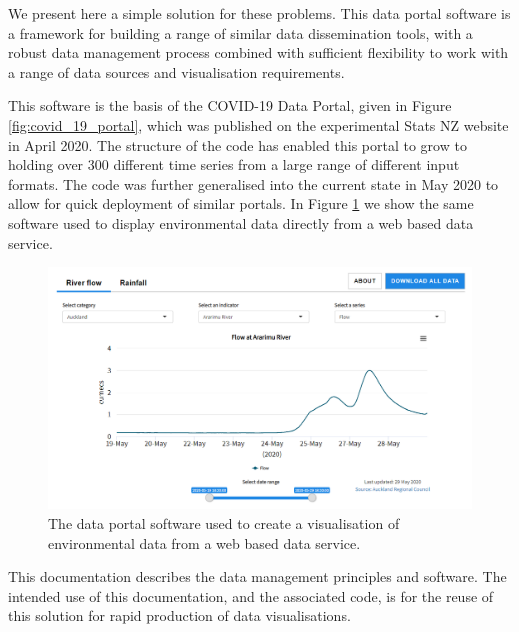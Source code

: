 \documentclass[12pt]{article}
\begin{document}
We present here a simple solution for these problems.  This data portal software is a framework for building a range of similar data dissemination tools, with a robust data management process combined with sufficient flexibility to work with a range of data sources and visualisation requirements.

This software is the basis of the COVID-19 Data Portal, given in Figure \ref{fig:covid_19_portal}, which was published on the experimental Stats NZ website in April 2020.  The structure of the code has enabled this portal to grow to holding over 300 different time series from a large range of different input formats.  The code was further generalised into the current state in May 2020 to allow for quick deployment of similar portals.  In Figure \ref{fig:env_data_portal} we show the same software used to display environmental data directly from a web based data service.

\begin{figure}[h]
\centering
\includegraphics[width=\textwidth]{figures/data_portal_alt.png}
 	\caption{The data portal software used to create a visualisation of environmental data from a web based data service.}\label{fig:env_data_portal}
\end{figure}

This documentation describes the data management principles and software.  The intended use of this documentation, and the associated code, is for the reuse of this solution for rapid production of data visualisations.
\end{document}
